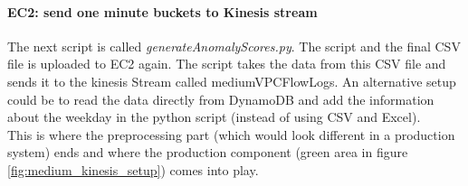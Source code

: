     \paragraph{EC2: send one minute buckets to Kinesis stream}
    The next script is called \textit{generateAnomalyScores.py}. The script and the final CSV file is uploaded to EC2 again. The script takes the data from this CSV file and sends it to the kinesis Stream called medium\textunderscore VPCFlowLogs. An alternative setup could be to read the data directly from DynamoDB and add the information about the weekday in the python script (instead of using CSV and Excel).\\
    This is where the preprocessing part (which would look different in a production system) ends and where the production component (green area in figure \ref{fig:medium_kinesis_setup}) comes into play.\\
    
